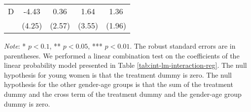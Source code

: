 \documentclass[12pt, a4paper]{article}
\begin{document}
\begin{table}[H]
\begin{threeparttable}
\begin{tabular}[t]{lcccc}
\hspace{1em}D & -4.43 & 0.36 & 1.64 & 1.36\\
\hspace{1em} & (4.25) & (2.57) & (3.55) & (1.96)\\
\bottomrule
\end{tabular}
\begin{tablenotes}
\item \emph{Note}: * $p < 0.1$, ** $p < 0.05$, *** $p < 0.01$. The robust standard errors are in parentheses. We performed a linear combination test on the coefficients of the linear probability model presented in Table \ref{tab:int-lm-interaction-reg}. The null hypothesis for young women is that the treatment dummy is zero. The null hypothesis for the other gender-age groups is that the sum of the treatment dummy and the cross term of the treatment dummy and the gender-age group dummy is zero.
\end{tablenotes}
\end{threeparttable}
\end{table}
\end{document}
